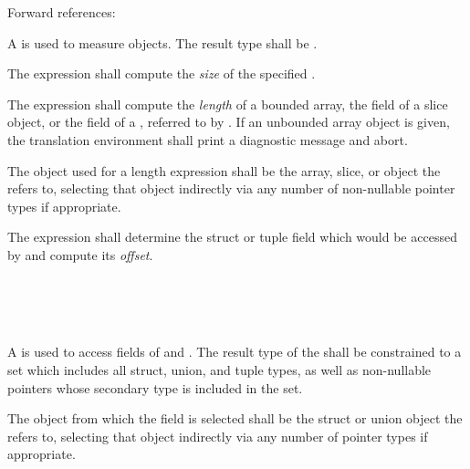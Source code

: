 Forward references: 

\specsubsubitem
A  is used to measure objects. The result
type shall be .

\specsubsubitem
The  expression shall compute the \textit{size} of the specified
.

\specsubsubitem
The  expression shall compute the \textit{length} of a bounded
array, the  field of a slice object, or the  field of
a , referred to by . If an unbounded array
object is given, the translation environment shall print a diagnostic message
and abort.

\specsubsubitem
The object used for a length expression shall be the array, slice, or
 object the  refers to, selecting that
object indirectly via any number of non-nullable pointer types if appropriate.

\specsubsubitem
The  expression shall determine the struct or tuple field
which would be accessed by  and compute
its \textit{offset}.


\begin{grammar}
 \\
	   \\
	   \\
\end{grammar}

\specsubsubitem
A  is used to access fields of
 and . The result type
of the  shall be constrained to a set which
includes all struct, union, and tuple types, as well as non-nullable pointers
whose secondary type is included in the set.


\specsubsubitem
The object from which the field is selected shall be the struct or union object
the  refers to, selecting that object indirectly
via any number of pointer types if appropriate.

